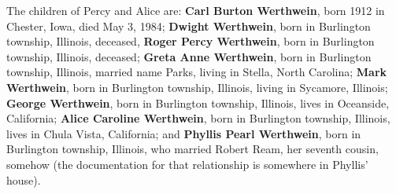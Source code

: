 The children of Percy and Alice are:
{\bf Carl Burton Werthwein}, born 1912 in Chester, Iowa, died May 3, 1984;
{\bf Dwight Werthwein}, born in Burlington township, Illinois, deceased,
{\bf Roger Percy Werthwein}, born in Burlington township, Illinois, deceased;
{\bf Greta Anne Werthwein}, born in Burlington township, Illinois, married name Parks, living in
Stella, North Carolina;
{\bf Mark Werthwein}, born in Burlington township, Illinois, living in Sycamore, Illinois;
{\bf George Werthwein}, born in Burlington township, Illinois, lives in Oceanside, California;
{\bf Alice Caroline Werthwein}, born in Burlington township, Illinois, lives in Chula Vista, California; and
{\bf Phyllis Pearl Werthwein}, born in Burlington township, Illinois, who married Robert Ream, her
seventh cousin, somehow (the documentation for that relationship is somewhere in Phyllis' house).

\bye

